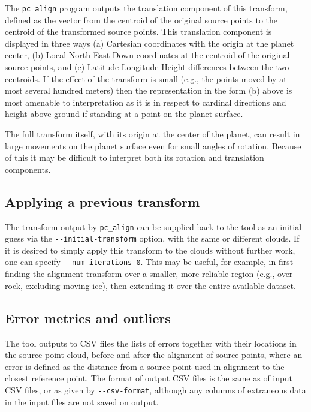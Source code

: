 The \texttt{pc\_align} program outputs the translation component of this
transform, defined as the vector from the centroid of the original
source points to the centroid of the transformed source points. This
translation component is displayed in three ways (a) Cartesian
coordinates with the origin at the planet center, (b) Local
North-East-Down coordinates at the centroid of the original source
points, and (c) Latitude-Longitude-Height differences between the two
centroids. If the effect of the transform is small (e.g., the points
moved by at most several hundred meters) then the representation in the
form (b) above is most amenable to interpretation as it is in respect
to cardinal directions and height above ground if standing at a point on
the planet surface.

The full transform itself, with its origin at the center of the planet,
can result in large movements on the planet surface even for small angles
of rotation. Because of this it may be difficult to interpret both its rotation
and translation components.

\subsection{Applying a previous transform}
\label{prevtrans}

The transform output by \texttt{pc\_align} can be supplied back to the
tool as an initial guess via the \texttt{-\/-initial-transform} option,
with the same or different clouds. If it is desired to simply apply this
transform to the clouds without further work, one can specify
\texttt{-\/-num-iterations 0}.  This may be useful, for example, in
first finding the alignment transform over a smaller, more reliable
region (e.g., over rock, excluding moving ice), then extending it over the entire
available dataset.

\subsection{Error metrics and outliers}

The tool outputs to CSV files the lists of errors together with their
locations in the source point cloud, before and after the alignment of
source points, where an error is defined as the distance from a source
point used in alignment to the closest reference point. The format of
output CSV files is the same as of input CSV files, or as given by
\texttt{-\/-csv-format}, although any columns of extraneous data in the
input files are not saved on output.

